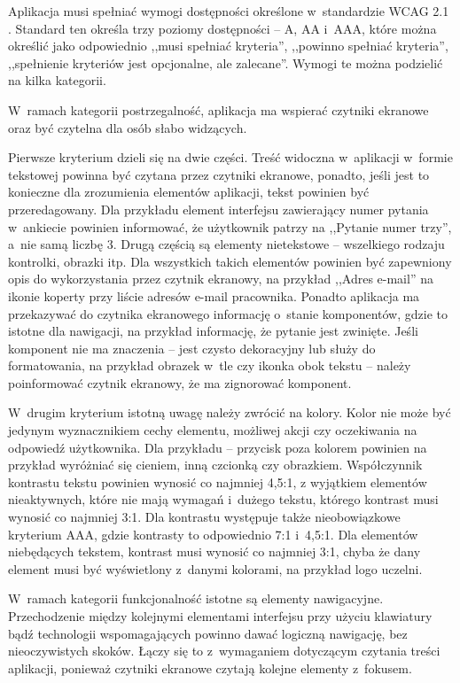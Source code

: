 \documentclass{pracamgr}
\begin{document}
Aplikacja musi spełniać wymogi dostępności określone w~standardzie WCAG 2.1 \cite{wcag21}.
Standard ten określa trzy poziomy dostępności -- A, AA i~AAA, które można określić jako
odpowiednio ,,musi spełniać kryteria'', ,,powinno spełniać kryteria'',
,,spełnienie kryteriów jest opcjonalne, ale zalecane''.
Wymogi te można podzielić na kilka kategorii.

W~ramach kategorii postrzegalność, aplikacja ma wspierać czytniki ekranowe oraz być czytelna
dla osób słabo widzących.

Pierwsze kryterium dzieli się na dwie części. Treść widoczna
w~aplikacji w~formie tekstowej powinna być czytana przez czytniki ekranowe, ponadto,
jeśli jest to konieczne dla zrozumienia elementów aplikacji, tekst powinien być przeredagowany.
Dla przykładu element interfejsu zawierający numer pytania w~ankiecie powinien informować, że
użytkownik patrzy na ,,Pytanie numer trzy'', a~nie samą liczbę 3. Drugą częścią są elementy
nietekstowe -- wszelkiego rodzaju kontrolki, obrazki itp. Dla wszystkich takich elementów
powinien być zapewniony opis do wykorzystania przez czytnik ekranowy, na przykład ,,Adres
e-mail'' na ikonie koperty przy liście adresów e-mail pracownika. Ponadto aplikacja ma
przekazywać do czytnika ekranowego informację o~stanie komponentów, gdzie to istotne dla
nawigacji, na przykład informację, że pytanie jest zwinięte. Jeśli komponent nie ma 
znaczenia -- jest czysto dekoracyjny lub służy do formatowania, na przykład obrazek w~tle
czy ikonka obok tekstu -- należy poinformować czytnik ekranowy, że ma zignorować komponent.

W~drugim kryterium istotną uwagę należy zwrócić na kolory. Kolor nie może być jedynym
wyznacznikiem cechy elementu, możliwej akcji czy oczekiwania na odpowiedź użytkownika.
Dla przykładu -- przycisk poza kolorem powinien na przykład wyróżniać się cieniem, inną
czcionką czy obrazkiem. Współczynnik kontrastu tekstu powinien wynosić co najmniej 4,5:1,
z wyjątkiem elementów nieaktywnych, które nie mają wymagań i~dużego tekstu, którego
kontrast musi wynosić co najmniej 3:1. Dla kontrastu występuje także nieobowiązkowe
kryterium AAA, gdzie kontrasty to odpowiednio 7:1 i~4,5:1. Dla elementów niebędących
tekstem, kontrast musi wynosić co najmniej 3:1, chyba że dany element musi być wyświetlony
z~danymi kolorami, na przykład logo uczelni.

W~ramach kategorii funkcjonalność istotne są elementy nawigacyjne. Przechodzenie
między kolejnymi elementami interfejsu przy użyciu klawiatury bądź technologii
wspomagających powinno dawać logiczną nawigację, bez nieoczywistych skoków. 
Łączy się to z~wymaganiem dotyczącym czytania treści aplikacji, ponieważ czytniki ekranowe
czytają kolejne elementy z~fokusem.
\end{document}
